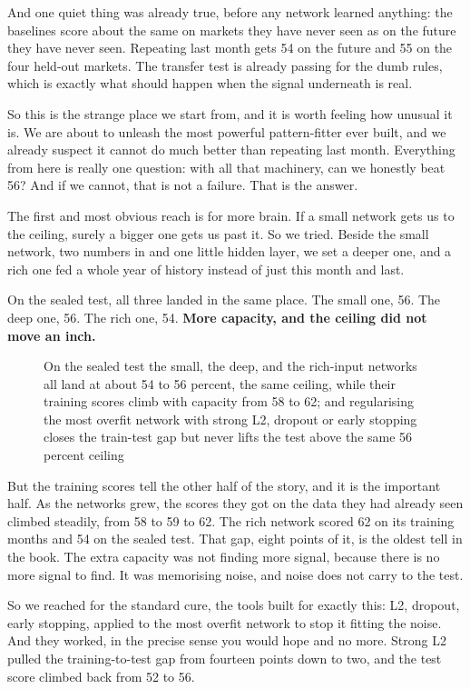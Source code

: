 \documentclass[11pt]{article} %
\begin{document}
And one quiet thing was already true, before any network learned anything: the baselines score about the same on markets they have never seen as on the future they have never seen. Repeating last month gets 54 on the future and 55 on the four held-out markets. The transfer test is already passing for the dumb rules, which is exactly what should happen when the signal underneath is real.

So this is the strange place we start from, and it is worth feeling how unusual it is. We are about to unleash the most powerful pattern-fitter ever built, and we already suspect it cannot do much better than repeating last month. Everything from here is really one question: with all that machinery, can we honestly beat 56? And if we cannot, that is not a failure. That is the answer.

The first and most obvious reach is for more brain. If a small network gets us to the ceiling, surely a bigger one gets us past it. So we tried. Beside the small network, two numbers in and one little hidden layer, we set a deeper one, and a rich one fed a whole year of history instead of just this month and last.

On the sealed test, all three landed in the same place. The small one, 56. The deep one, 56. The rich one, 54. \textbf{More capacity, and the ceiling did not move an inch.}

\begin{figure}[htbp]
\centering

\caption{On the sealed test the small, the deep, and the rich-input networks all land at about 54 to 56 percent, the same ceiling, while their training scores climb with capacity from 58 to 62; and regularising the most overfit network with strong L2, dropout or early stopping closes the train-test gap but never lifts the test above the same 56 percent ceiling}
\end{figure}


But the training scores tell the other half of the story, and it is the important half. As the networks grew, the scores they got on the data they had already seen climbed steadily, from 58 to 59 to 62. The rich network scored 62 on its training months and 54 on the sealed test. That gap, eight points of it, is the oldest tell in the book. The extra capacity was not finding more signal, because there is no more signal to find. It was memorising noise, and noise does not carry to the test.

So we reached for the standard cure, the tools built for exactly this: L2, dropout, early stopping, applied to the most overfit network to stop it fitting the noise. And they worked, in the precise sense you would hope and no more. Strong L2 pulled the training-to-test gap from fourteen points down to two, and the test score climbed back from 52 to 56.
\end{document}
